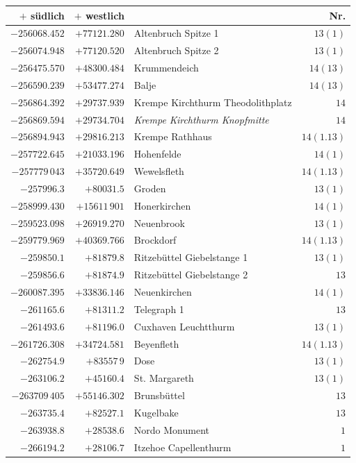 \clearpage{}%
\begin{center}\begingroup\fontsize{8}{9}\selectfont
\setlength{\tabcolsep}{4pt}
\begin{tabular}{r|r|p{170pt}|r}\hline
\(+\) südlich&\(+\) westlich&&Nr.\\\hline
\(-256068.452\)&\(+77121.280\)&Altenbruch Spitze 1&\(13(1)\)\\
\(-256074.948\)&\(+77120.520\)&Altenbruch Spitze 2&\(13(1)\)\\
\(-256475.570\)&\(+48300.484\)&Krummendeich&\(14(13)\)\\
\(-256590.239\)&\(+53477.274\)&Balje&\(14(13)\)\\
\(-256864.392\)&\(+29737.939\)&Krempe Kirchthurm Theodolithplatz&\(14\)\\
\(-256869.594\)&\(+29734.704\)&\textit{Krempe Kirchthurm Knopfmitte}&\(14\)\\
\(-256894.943\)&\(+29816.213\)&Krempe Rathhaus&\(14(1.13)\)\\
\(-257722.645\)&\(+21033.196\)&Hohenfelde&\(14(1)\)\\
\(-257779\,043\)&\(+35720.649\)&Wewelsfleth&\(14(1.13)\)\\
\(-257996.3\)&\(+80031.5\)&Groden&\(13(1)\)\\
\(-258999.430\)&\(+15611\,901\)&Honerkirchen&\(14(1)\)\\
\(-259523.098\)&\(+26919.270\)&Neuenbrook&\(13(1)\)\\
\(-259779.969\)&\(+40369.766\)&Brockdorf&\(14(1.13)\)\\
\(-259850.1\)&\(+81879.8\)&Ritzebüttel Giebelstange 1&\(13(1)\)\\
\(-259856.6\)&\(+81874.9\)&Ritzebüttel Giebelstange 2&\(13\)\\
\(-260087.395\)&\(+33836.146\)&Neuenkirchen&\(14(1)\)\\
\(-261165.6\)&\(+81311.2\)&Telegraph 1&\(13\)\\
\(-261493.6\)&\(+81196.0\)&Cuxhaven Leuchtthurm&\(13(1)\)\\
\(-261726.308\)&\(+34724.581\)&Beyenfleth&\(14(1.13)\)\\
\(-262754.9\)&\(+83557\,9\)&Dose&\(13(1)\)\\
\(-263106.2\)&\(+45160.4\)&St. Margareth&\(13(1)\)\\
\(-263709\,405\)&\(+55146.302\)&Brunsbüttel&\(13\)\\
\(-263735.4\)&\(+82527.1\)&Kugelbake&\(13\)\\
\(-263938.8\)&\(+28538.6\)&Nordo Monument&\(1\)\\
\(-266194.2\)&\(+28106.7\)&Itzehoe Capellenthurm&\(1\)\\
\hline\end{tabular}\endgroup\end{center}
